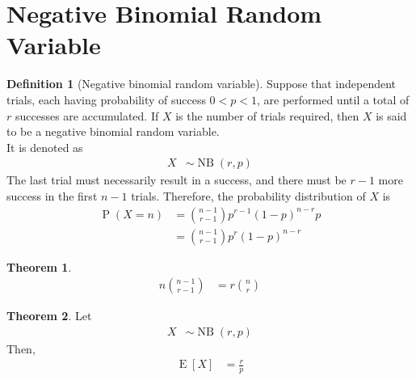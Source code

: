 \documentclass[titlepage, fleqn, a4paper, 12pt, twoside]{article}
\theoremstyle{definition}
\newtheorem{definition}{Definition}
\theoremstyle{theorem}
\newtheorem{theorem}{Theorem}
\DeclareMathOperator{\prob}{\mathrm{P}}
\DeclareMathOperator{\expct}{\mathrm{E}}
\DeclareMathOperator{\nb}{\mathrm{NB}}
\begin{document}
\section{Negative Binomial Random Variable}

\begin{definition}[Negative binomial random variable]
	Suppose that independent trials, each having probability of success $0 < p < 1$, are performed until a total of $r$ successes are accumulated.
	If $X$ is the number of trials required, then $X$ is said to be a negative binomial random variable.\\
	It is denoted as
	\begin{align*}
		X & \sim \nb(r,p)
	\end{align*}
	The last trial must necessarily result in a success, and there must be $r - 1$ more success in the first $n - 1$ trials.
	Therefore, the probability distribution of $X$ is
	\begin{align*}
		\prob(X = n) & = \binom{n - 1}{r - 1} p^{r - 1} (1 - p)^{n - r} p \\
                             & = \binom{n - 1}{r - 1} p^r (1 - p)^{n - r}
	\end{align*}
\end{definition}

\begin{theorem}
	\begin{align*}
		n \binom{n - 1}{r - 1} & = r \binom{n}{r}
	\end{align*}
\end{theorem}

\begin{theorem}
	Let
	\begin{align*}
		X & \sim \nb(r,p)
	\end{align*}
	Then,
	\begin{align*}
		\expct[X] & = \frac{r}{p}
	\end{align*}
\end{theorem}
\end{document}
